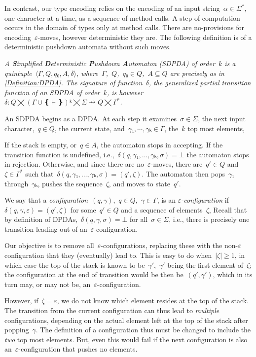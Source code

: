 In contrast, our type encoding relies on the encoding of an input string~$α∈Σ^*$, one character at a time, as a sequence of method calls.
A step of computation occurs in the domain of \Java types only at method calls. There are no-provisions for encoding~$ε$-moves, however deterministic
  they are.
The following definition is of a deterministic pushdown automata without such moves.

\begin{Definition}
  \label{Definition:SDPDA}
  \slshape
  A \emph{\textbf Simplified \textbf Deterministic \textbf Pushdown \textbf Automaton} (SDPDA) of order~$k$ is
    a quintuple~$⟨Γ,Q,q₀,A,δ⟩$,
  where~$Γ$,~$Q$,~$q₀∈Q$,~$A⊆Q$ are precisely as in \cref{Definition:DPDA}.
  The signature of function~$δ$, the \emph{generalized partial transition function}
  of an SDPDA of order~$k$, is however~$δ: Q⨉\left(Γ∪❴\vdash❵\right)ᵏ⨉Σ↛Q⨉Γ^*$.
  \par
  An SDPDA begins as a DPDA\@. At each step it examines~$σ∈Σ$,
    the next input character,~$q∈Q$, the current state,
    and~$γ₁,⋯,γₖ∈Γ$, the~$k$ top most elements,
  \par
  If the stack is empty, or~$q∈A$, the automaton stops in accepting.
  If the transition function is undefined, i.e.,~$δ(q,γ₁,…,γₖ,σ)=⊥$ the automaton
    stops in rejection.
  Otherwise, and since there are no~$ε$-moves, there are~$q'∈Q$ and~$ζ∈Γ^*$
    such that~$δ(q,γ₁,…,γₖ,σ)=(q',ζ)$.
  The automaton then pops~$γ₁$ through~$γₖ$, pushes the sequence~$ζ$, and
    moves to state~$q'$.
\end{Definition}

We say that
a \emph{configuration}~$(q,γ)$,~$q∈Q$,~$γ∈Γ$,
  is an \emph{$ε$-configuration} if~$δ(q,γ,ε)=(q',ζ)$ for
    some~$q'∈Q$ and a sequence of elements~$ζ$,
Recall that by definition of DPDAs,~$δ(q,γ,σ)=⊥$ for
  all~$σ∈Σ$, i.e., there is precisely one transition
  leading out of an~$ε$-configuration.

Our objective is to remove all~$ε$-configurations,
  replacing these with the non-$ε$ configuration that
  they (eventually) lead to.
This is easy to do when~$|ζ|≥1$, in which
  case the top of the stack is known to be~$γ'$,~$γ'$ being the first
    element of~$ζ$; the configuration at the end of transition
    would be then be~$(q',γ')$, which in its turn may, or may not be,
    an~$ε$-configuration.

However, if~$ζ=ε$, we do not know which element resides at the top
  of the stack.
The transition from the current configuration can thus lead to \emph{multiple} configurations,
  depending on the actual element left at the top of the stack after popping~$γ$.
The definition of a configuration thus must be changed to include the \emph{two} top
  most elements.
But, even this would fail if the next configuration is also an~$ε$-configuration that pushes no elements.

